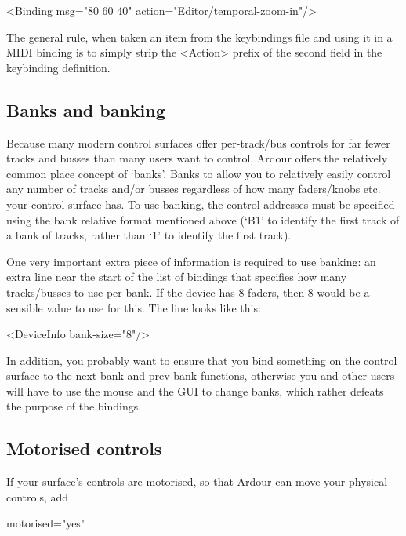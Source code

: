 \documentclass[10pt,a4paper]{book}
\begin{document}
\begin{listing}
<Binding msg="80 60 40" action="Editor/temporal-zoom-in"/>
\end{listing}

The general rule, when taken an item from the keybindings file and
using it in a MIDI binding is to simply strip the <Action> prefix of
the second field in the keybinding definition.

\subsection{Banks and banking}

Because many modern control surfaces offer per-track/bus controls for
far fewer tracks and busses than many users want to control, Ardour
offers the relatively common place concept of `banks'. Banks to allow
you to relatively easily control any number of tracks and/or busses
regardless of how many faders/knobs etc. your control surface has. To
use banking, the control addresses must be specified using the bank
relative format mentioned above (`B1' to identify the first track of a
bank of tracks, rather than `1' to identify the first track).

One very important extra piece of information is required to use
banking: an extra line near the start of the list of bindings that
specifies how many tracks/busses to use per bank. If the device has 8
faders, then 8 would be a sensible value to use for this. The line
looks like this:

\begin{listing}
<DeviceInfo bank-size="8"/>
\end{listing}

In addition, you probably want to ensure that you bind something on
the control surface to the next-bank and prev-bank functions,
otherwise you and other users will have to use the mouse and the GUI
to change banks, which rather defeats the purpose of the bindings.

\subsection{Motorised controls}

If your surface's controls are motorised, so that Ardour can move your physical controls,
add

\begin{listing}
motorised="yes"
\end{listing}
\end{document}

